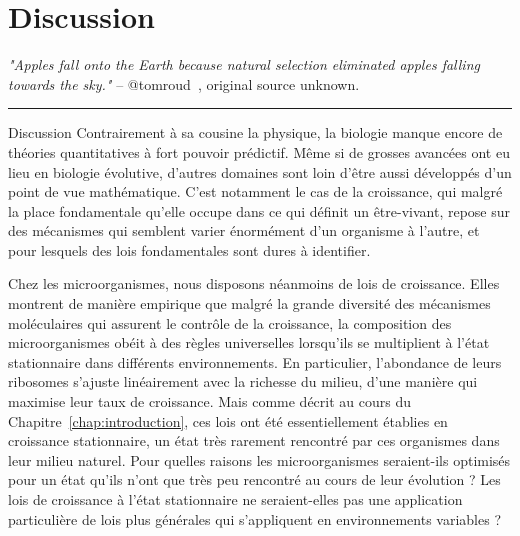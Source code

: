 \chapter{Discussion}
\label{chap:discussion}

\textit{"Apples fall onto the Earth because natural selection eliminated apples falling towards the sky."} -- @tomroud~\cite{tomroud_tom_2016}, original source unknown.

\begin{center}
\noindent\rule{4cm}{0.1pt}
\end{center}

\begin{chapter_summary}{Discussion}
Contrairement à sa cousine la physique, la biologie manque encore de théories quantitatives à fort pouvoir prédictif.
Même si de grosses avancées ont eu lieu en biologie évolutive, d'autres domaines sont loin d'être aussi développés d'un point de vue mathématique.
C'est notamment le cas de la croissance, qui malgré la place fondamentale qu'elle occupe dans ce qui définit un être-vivant, repose sur des mécanismes qui semblent varier énormément d'un organisme à l'autre, et pour lesquels des lois fondamentales sont dures à identifier.

Chez les microorganismes, nous disposons néanmoins de lois de croissance.
Elles montrent de manière empirique que malgré la grande diversité des mécanismes moléculaires qui assurent le contrôle de la croissance, la composition des microorganismes obéit à des règles universelles lorsqu'ils se multiplient à l'état stationnaire dans différents environnements.
En particulier, l'abondance de leurs ribosomes s'ajuste linéairement avec la richesse du milieu, d'une manière qui maximise leur taux de croissance.
Mais comme décrit au cours du Chapitre~\ref{chap:introduction}, ces lois ont été essentiellement établies en croissance stationnaire, un état très rarement rencontré par ces organismes dans leur milieu naturel.
Pour quelles raisons les microorganismes seraient-ils optimisés pour un état qu'ils n'ont que très peu rencontré au cours de leur évolution ?
Les lois de croissance à l'état stationnaire ne seraient-elles pas une application particulière de lois plus générales qui s'appliquent en environnements variables ?


\end{chapter_summary}
